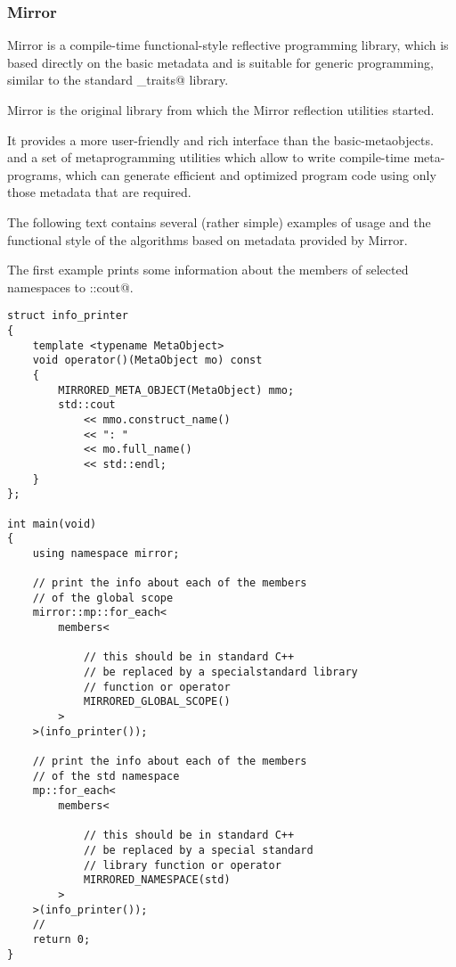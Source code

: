 \subsubsection{Mirror}

Mirror is a compile-time functional-style reflective programming library,
which is based directly on the basic metadata and is suitable for generic programming,
similar to the standard \verb@type_traits@ library.

Mirror is the original library from which the Mirror reflection utilities started.

It provides a more user-friendly and rich interface than the basic-metaobjects.
and a set of metaprogramming utilities which allow
to write compile-time meta-programs, which can generate efficient
and optimized program code using only those metadata that are required.

The following text contains several (rather simple) examples of usage
and the functional style of the algorithms based on metadata provided by Mirror.

The first example prints some information about the members of selected
namespaces to \verb@std::cout@.

\begin{verbatim}
struct info_printer
{
    template <typename MetaObject>
    void operator()(MetaObject mo) const
    {
        MIRRORED_META_OBJECT(MetaObject) mmo;
        std::cout
            << mmo.construct_name()
            << ": "
            << mo.full_name()
            << std::endl;
    }
};

int main(void)
{
    using namespace mirror;

    // print the info about each of the members
    // of the global scope
    mirror::mp::for_each<
        members<

            // this should be in standard C++
            // be replaced by a specialstandard library
            // function or operator
            MIRRORED_GLOBAL_SCOPE()
        >
    >(info_printer());

    // print the info about each of the members
    // of the std namespace
    mp::for_each<
        members<

            // this should be in standard C++
            // be replaced by a special standard
            // library function or operator
            MIRRORED_NAMESPACE(std)
        >
    >(info_printer());
    //
    return 0;
}
\end{verbatim}

